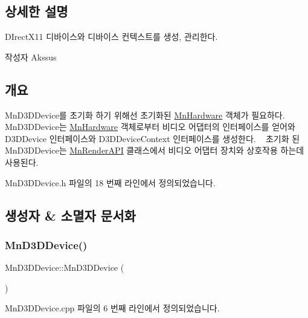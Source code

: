 \subsection{상세한 설명}
D\+Irect\+X11 디바이스와 디바이스 컨텍스트를 생성, 관리한다. 

\begin{DoxyAuthor}{작성자}
Akssus 
\end{DoxyAuthor}
\hypertarget{class_m_n_l_1_1_mn_video_adapter_개요}{}\subsection{개요}\label{class_m_n_l_1_1_mn_video_adapter_개요}
Mn\+D3\+D\+Device를 초기화 하기 위해선 초기화된 \hyperlink{class_m_n_l_1_1_mn_hardware}{Mn\+Hardware} 객체가 필요하다. ~\newline
Mn\+D3\+D\+Device는 \hyperlink{class_m_n_l_1_1_mn_hardware}{Mn\+Hardware} 객체로부터 비디오 어댑터의 인터페이스를 얻어와 D3\+D\+Device 인터페이스와 D3\+D\+Device\+Context 인터페이스를 생성한다. ~\newline
초기화 된 Mn\+D3\+D\+Device는 \hyperlink{class_m_n_l_1_1_mn_render_a_p_i}{Mn\+Render\+A\+PI} 클래스에서 비디오 어댑터 장치와 상호작용 하는데 사용된다. 

Mn\+D3\+D\+Device.\+h 파일의 18 번째 라인에서 정의되었습니다.



\subsection{생성자 \& 소멸자 문서화}
\mbox{\label{class_m_n_l_1_1_mn_d3_d_device_a73cd90c6f415ae81a05cdb11303c1d51}} 
\subsubsection{\texorpdfstring{Mn\+D3\+D\+Device()}{MnD3DDevice()}}
{\footnotesize\ttfamily Mn\+D3\+D\+Device\+::\+Mn\+D3\+D\+Device (\begin{DoxyParamCaption}{ }\end{DoxyParamCaption})}



Mn\+D3\+D\+Device.\+cpp 파일의 6 번째 라인에서 정의되었습니다.


